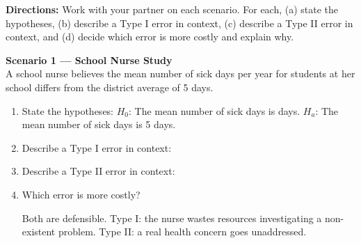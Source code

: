 \documentclass[10pt]{article}
\begin{document}
\namepartnerperiod

\vspace{0.1in}
\textbf{Directions:} Work with your partner on each scenario. For each, (a) state the
hypotheses, (b) describe a Type I error in context, (c) describe a Type II error in
context, and (d) decide which error is more costly and explain why.

\begin{tcolorbox}[colback=white, colframe=black!40, title=\textbf{Tier R --- Remediate},
    fonttitle=\bfseries, arc=2mm, left=3mm, right=3mm, top=2mm, bottom=2mm]

\textbf{Scenario 1 --- School Nurse Study}\\
A school nurse believes the mean number of sick days per year for students at her school
differs from the district average of 5 days.

\begin{enumerate}[label=\alph*.]
  \item State the hypotheses:
        $H_0$: The mean number of sick days is  days.
        $H_a$: The mean number of sick days is  5 days.

  \item Describe a Type I error in context:

  \item Describe a Type II error in context:

  \item Which error is more costly?
        \begin{teachernote}
            Both are defensible. Type I: the nurse wastes resources investigating a
            non-existent problem. Type II: a real health concern goes unaddressed.
        \end{teachernote}
\end{enumerate}
\end{tcolorbox}
\end{document}
